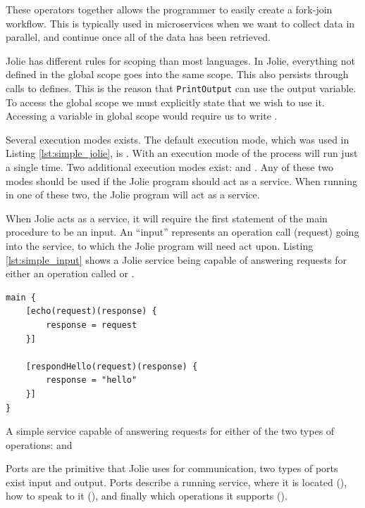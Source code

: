 These operators together allows the programmer to easily create a fork-join
workflow.  This is typically used in microservices when we want to collect data
in parallel, and continue once all of the data has been retrieved.

Jolie has different rules for scoping than most languages. In Jolie, everything
not defined in the global scope goes into the same scope. This also persists
through calls to defines. This is the reason that \verb!PrintOutput! can use
the output variable. To access the global scope we must explicitly state that
we wish to use it. Accessing a variable  in global scope would
require us to write .

Several execution modes exists. The default execution mode, which was used in
Listing \ref{lst:simple_jolie}, is . With an execution mode of
 the  process will run just a single time. Two
additional execution modes exist:  and .
Any of these two modes should be used if the Jolie program should act as a
service. When running in one of these two, the Jolie program will act as a
service.

When Jolie acts as a service, it will require the first statement of the main
procedure to be an input. An ``input'' represents an operation call (request)
going into the service, to which the Jolie program will need act upon.  Listing
\ref{lst:simple_input} shows a Jolie service being capable of answering
requests for either an operation called  or .

\begin{listing}[H]
\begin{verbatim}
main {
    [echo(request)(response) {
        response = request
    }]

    [respondHello(request)(response) {
        response = "hello"
    }]
}
\end{verbatim}

\caption{A simple service capable of answering requests for either of the two
    types of operations:  and }

\label{lst:simple_input}
\end{listing}

Ports are the primitive that Jolie uses for communication, two types of ports
exist input and output. Ports describe a running service, where it is located
(), how to speak to it (), and finally which
operations it supports ().


